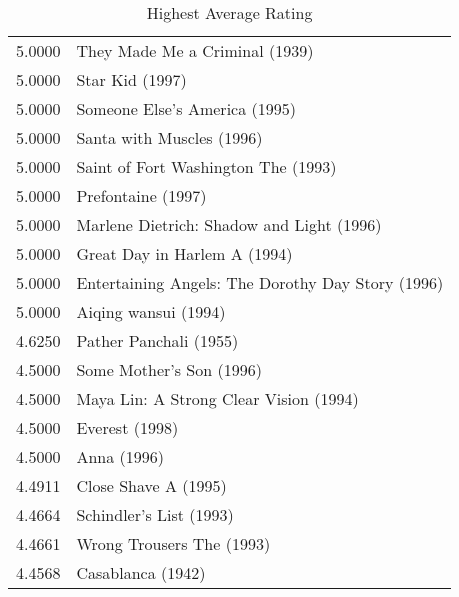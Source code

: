 \begin{flushleft}
\begin{table}[h]
\centering
\begin{tabular}{ll}

5.0000 & They Made Me a Criminal (1939)                          \\
5.0000 & Star Kid (1997)                                         \\
5.0000 & Someone Else's America (1995)                           \\
5.0000 & Santa with Muscles (1996)                               \\
5.0000 & Saint of Fort Washington The (1993)                     \\
5.0000 & Prefontaine (1997)                                      \\
5.0000 & Marlene Dietrich: Shadow and Light (1996)               \\
5.0000 & Great Day in Harlem A (1994)                            \\
5.0000 & Entertaining Angels: The Dorothy Day Story (1996)       \\
5.0000 & Aiqing wansui (1994)                                    \\
4.6250 & Pather Panchali (1955)                                  \\
4.5000 & Some Mother's Son (1996)                                \\
4.5000 & Maya Lin: A Strong Clear Vision (1994)                  \\
4.5000 & Everest (1998)                                          \\
4.5000 & Anna (1996)                                             \\ \hline
4.4911 & Close Shave A (1995)                                    \\ \hline
4.4664 & Schindler's List (1993)                                 \\ \hline
4.4661 & Wrong Trousers The (1993)                               \\ \hline
4.4568 & Casablanca (1942)                                       \\
\end{tabular}
\caption{Highest Average Rating}
\end{table}

\end{flushleft}




